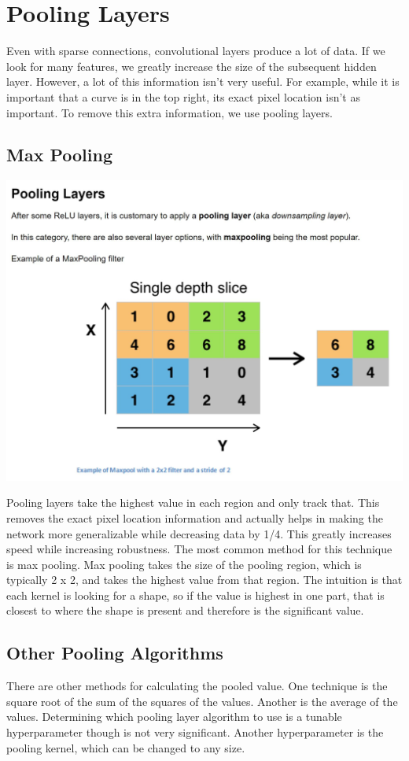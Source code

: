 \documentclass{exam}
\begin{document}
\section{Pooling Layers}
Even with sparse connections, convolutional layers produce a lot of data. If we look for many features, we greatly increase the size of the subsequent hidden layer. However, a lot of this information isn't very useful. For example, while it is important that a curve is in the top right, its exact pixel location isn't as important. To remove this extra information, we use pooling layers.

\subsection{Max Pooling}
\begin{center}
\includegraphics[scale=0.5]{pooling}
\end{center}
Pooling layers take the highest value in each region and only track that. This removes the exact pixel location information and actually helps in making the network more generalizable while decreasing data by 1/4. This greatly increases speed while increasing robustness. The most common method for this technique is max pooling. Max pooling takes the size of the pooling region, which is typically 2 x 2, and takes the highest value from that region. The intuition is that each kernel is looking for a shape, so if the value is highest in one part, that is closest to where the shape is present and therefore is the significant value.

\subsection{Other Pooling Algorithms}
There are other methods for calculating the pooled value. One technique is the square root of the sum of the squares of the values. Another is the average of the values. Determining which pooling layer algorithm to use is a tunable hyperparameter though is not very significant. Another hyperparameter is the pooling kernel, which can be changed to any size.
\end{document}

